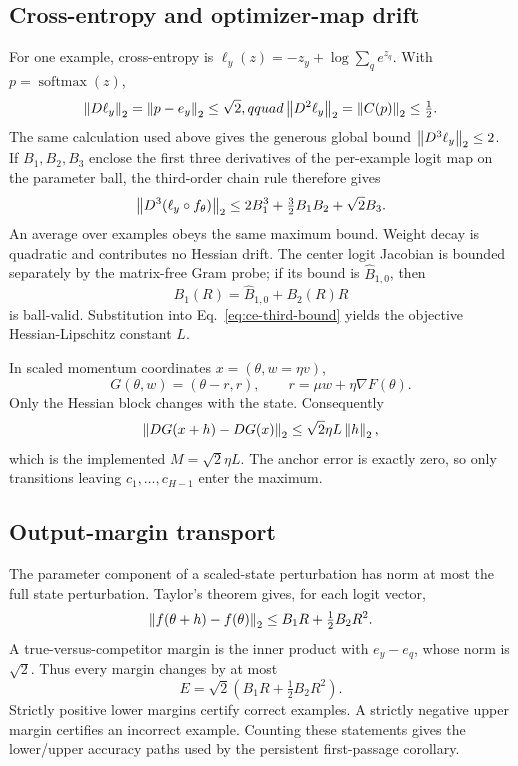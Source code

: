 \subsection{Cross-entropy and optimizer-map drift}

For one example, cross-entropy is
$\ell_y(z)=-z_y+\log\sum_q e^{z_q}$.  With $p=\operatorname{softmax}(z)$,
\begin{equation}
 \left\lVert D\ell_y\right\rVert_2=\left\lVert p-e_y\right\rVert_2\le\sqrt2,qquad
 \left\lVert D^2\ell_y\right\rVert_2=\left\lVert C(p)\right\rVert_2\le\tfrac12.
\end{equation}
The same calculation used above gives the generous global bound
$\left\lVert D^3\ell_y\right\rVert_2\le2$.  If $B_1,B_2,B_3$ enclose the first three derivatives
of the per-example logit map on the parameter ball, the third-order chain rule
therefore gives
\begin{equation}
 \left\lVert D^3(\ell_y\circ f_\theta)\right\rVert_2
 \le 2B_1^3+\tfrac32B_1B_2+\sqrt2 B_3.
 \label{eq:ce-third-bound}
\end{equation}
An average over examples obeys the same maximum bound.  Weight decay is
quadratic and contributes no Hessian drift.  The center logit Jacobian is
bounded separately by the matrix-free Gram probe; if its bound is
$\widehat B_{1,0}$, then
\begin{equation}
 B_1(R)=\widehat B_{1,0}+B_2(R)R
\end{equation}
is ball-valid.  Substitution into Eq.~\eqref{eq:ce-third-bound} yields the
objective Hessian-Lipschitz constant $L$.

In scaled momentum coordinates $x=(\theta,w=\eta v)$,
\begin{equation}
G(\theta,w)=(\theta-r,r),\qquad
r=\mu w+\eta\nabla F(\theta).
\end{equation}
Only the Hessian block changes with the state.  Consequently
\begin{equation}
 \left\lVert DG(x+h)-DG(x)\right\rVert_2\le\sqrt2\eta L\left\lVert h\right\rVert_2,
\end{equation}
which is the implemented $M=\sqrt2\eta L$.  The anchor error is exactly zero,
so only transitions leaving $c_1,\ldots,c_{H-1}$ enter the maximum.

\subsection{Output-margin transport}

The parameter component of a scaled-state perturbation has norm at most the
full state perturbation.  Taylor's theorem gives, for each logit vector,
\begin{equation}
 \left\lVert f(\theta+h)-f(\theta)\right\rVert_2
 \le B_1R+\tfrac12B_2R^2.
\end{equation}
A true-versus-competitor margin is the inner product with $e_y-e_q$, whose
norm is $\sqrt2$.  Thus every margin changes by at most
\begin{equation}
 E=\sqrt2\left(B_1R+\tfrac12B_2R^2\right).
\end{equation}
Strictly positive lower margins certify correct examples.  A strictly negative
upper margin certifies an incorrect example.  Counting these statements gives
the lower/upper accuracy paths used by the persistent first-passage corollary.

